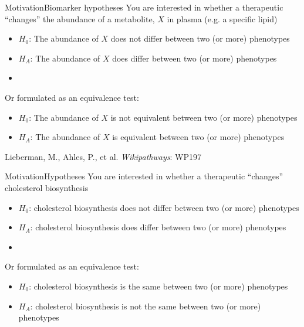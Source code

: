 \documentclass[xcolor=dvipsnames]{beamer}
\begin{document}
\begin{frame}{Motivation}{Biomarker hypotheses}
	\vspace{-10pt}
	You are interested in whether a therapeutic ``changes'' the abundance of a metabolite, $X$ in plasma (e.g. a specific lipid)
	\begin{itemize}
		\item $H_0$: The abundance of $X$ does not differ between two (or more) phenotypes 
		\item $H_A$: The abundance of $X$ does differ between two (or more) phenotypes 
		\item[]
	\end{itemize} 
	
	Or formulated as an equivalence test:
	\begin{itemize}
		\item $H_0$: The abundance of $X$ is not equivalent between two (or more) phenotypes  
		\item $H_A$: The abundance of $X$ is equivalent between two (or more) phenotypes  
	\end{itemize}
\end{frame}

\begin{frame}
	\begin{center}
			
			Lieberman, M., Ahles, P., et al. \emph{Wikipathways}: WP197
	\end{center}
\end{frame}

\begin{frame}{Motivation}{Hypotheses}
	\vspace{-10pt}
	You are interested in whether a therapeutic ``changes'' cholesterol biosynthesis
	\begin{itemize}
		\item $H_0$: cholesterol biosynthesis does not differ between two (or more) phenotypes 
		\item $H_A$: cholesterol biosynthesis does differ between two (or more) phenotypes
		\item[]
	\end{itemize} 
	
	Or formulated as an equivalence test:
	\begin{itemize}
		\item $H_0$: cholesterol biosynthesis is the same between two (or more) phenotypes 
		\item $H_A$: cholesterol biosynthesis is not the same between two (or more) phenotypes
	\end{itemize}
\end{frame}
\end{document}
